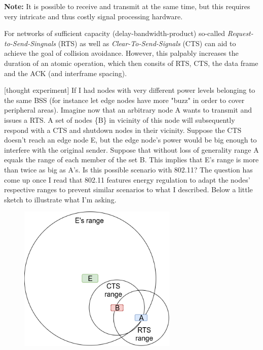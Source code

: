 \documentclass{article}
\begin{document}
	\medskip
	
	\textbf{Note:} It is possible to receive and transmit at the same time, but this requires very intricate and thus costly signal processing hardware. 
	
	\bigskip
	
	For networks of sufficient capacity (delay-bandwidth-product) so-called \emph{Request-to-Send-Singnals} (RTS) as well as \emph{Clear-To-Send-Signals} (CTS) can aid to achieve the goal of collision avoidance. However, this palpably increases the duration of an atomic operation, which then consits of RTS, CTS, the data frame and the ACK (and interframe spacing).
	
	\bigskip
	
	\color{blue}
	[thought experiment] If I had nodes with very different power levels belonging to the same BSS (for instance let edge nodes have more "buzz" in order to cover peripheral areas). Imagine now that an arbitrary node A wants to transmit and issues a RTS. A set of nodes \{B\} in vicinity of this node will subsequently respond with a CTS and shutdown nodes in their vicinity. Suppose the CTS doesn't reach an edge node E, but the edge node's power would be big enough to interfere with the original sender. Suppose that without loss of generality range A equals the range of each member of the set {B}. This implies that E's range is more than twice as big as A's. Is this possible scenario with 802.11? The question has come up once I read that 802.11 features energy regulation to adapt the nodes' respective ranges to prevent similar scenarios to what I described. Below a little sketch to illustrate what I'm asking.
	\color{black}
	
	\begin{figure}[h] \label{signal-ranges}
		\includegraphics[height=7cm, keepaspectratio]{signal-ranges}
		\centering
	\end{figure}
	
\end{document}

